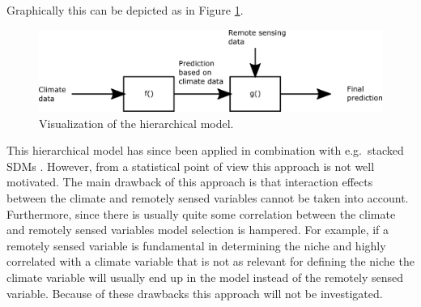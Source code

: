 Graphically this can be depicted as in Figure \ref{fig:chClassificationTechniques:HierarchicalClassification}.\\

\begin{figure}[!htb]
\centering
\includegraphics[scale=0.5]{VectorGraphics/HierarchicalClassification.png}
\caption{\label{fig:chClassificationTechniques:HierarchicalClassification}Visualization of the hierarchical model.}
\end{figure}

This hierarchical model has since been applied in combination with e.g.\ stacked SDMs \parencite{cord_remote_2014}. However, from a statistical point of view this approach is not well motivated. The main drawback of this approach is that interaction effects between the climate and remotely sensed variables cannot be taken into account. Furthermore, since there is usually quite some correlation between the climate and remotely sensed variables model selection is hampered. For example, if a remotely sensed variable is fundamental in determining the niche and highly correlated with a climate variable that is not as relevant for defining the niche the climate variable will usually end up in the model instead of the remotely sensed variable. Because of these drawbacks this approach will not be investigated.







